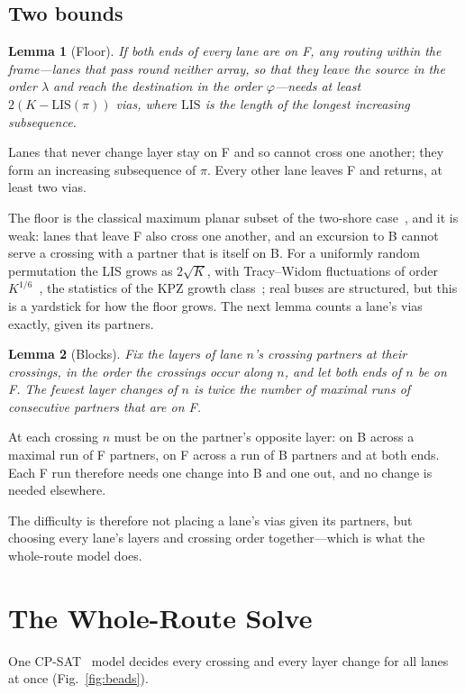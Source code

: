 \documentclass[journal]{IEEEtran}
\newtheorem{lemma}{Lemma}
\begin{document}
\subsection{Two bounds}
\begin{lemma}[Floor]
\label{lem:floor}
If both ends of every lane are on F, any routing within the frame---lanes that pass round neither array, so that they leave the source in the order $\lambda$ and reach the destination in the order $\varphi$---needs at least $2(K-\mathrm{LIS}(\pi))$ vias, where $\mathrm{LIS}$ is the length of the longest increasing subsequence.
\end{lemma}
\begin{IEEEproof}
Lanes that never change layer stay on F and so cannot cross one another; they form an increasing subsequence of $\pi$. Every other lane leaves F and returns, at least two vias.
\end{IEEEproof}
The floor is the classical maximum planar subset of the two-shore case~\cite{sarrafzadeh1989}, and it is weak: lanes that leave F also cross one another, and an excursion to B cannot serve a crossing with a partner that is itself on B. For a uniformly random permutation the LIS grows as $2\sqrt{K}$, with Tracy--Widom fluctuations of order $K^{1/6}$~\cite{baik1999}, the statistics of the KPZ growth class~\cite{prahofer2000}; real buses are structured, but this is a yardstick for how the floor grows. The next lemma counts a lane's vias exactly, given its partners.

\begin{lemma}[Blocks]
\label{lem:blocks}
Fix the layers of lane $n$'s crossing partners at their crossings, in the order the crossings occur along $n$, and let both ends of $n$ be on F. The fewest layer changes of $n$ is twice the number of maximal runs of consecutive partners that are on F.
\end{lemma}
\begin{IEEEproof}
At each crossing $n$ must be on the partner's opposite layer: on B across a maximal run of F partners, on F across a run of B partners and at both ends. Each F run therefore needs one change into B and one out, and no change is needed elsewhere.
\end{IEEEproof}
The difficulty is therefore not placing a lane's vias given its partners, but choosing every lane's layers and crossing order together---which is what the whole-route model does.

\section{The Whole-Route Solve}
\label{sec:solve}
One CP-SAT~\cite{cpsat} model decides every crossing and every layer change for all lanes at once (Fig.~\ref{fig:beads}).
\end{document}
